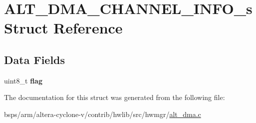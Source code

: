 \hypertarget{structALT__DMA__CHANNEL__INFO__s}{}\section{A\+L\+T\+\_\+\+D\+M\+A\+\_\+\+C\+H\+A\+N\+N\+E\+L\+\_\+\+I\+N\+F\+O\+\_\+s Struct Reference}
\label{structALT__DMA__CHANNEL__INFO__s}
\subsection*{Data Fields}
\begin{DoxyCompactItemize}
\item 
\mbox{\label{structALT__DMA__CHANNEL__INFO__s_a0061b0a3fac7b775a1964e8c7503d011}} 
uint8\+\_\+t {\bfseries flag}
\end{DoxyCompactItemize}


The documentation for this struct was generated from the following file\+:\begin{DoxyCompactItemize}
\item 
bsps/arm/altera-\/cyclone-\/v/contrib/hwlib/src/hwmgr/\mbox{\hyperlink{alt__dma_8c}{alt\+\_\+dma.\+c}}\end{DoxyCompactItemize}
